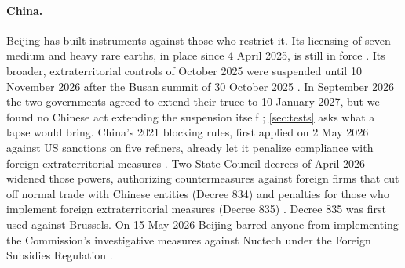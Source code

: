 \paragraph{China.} Beijing has built instruments against those who restrict it. Its licensing of seven medium and heavy rare earths, in place since 4 April 2025, is still in force \citep{mofcom2025rareearth, benchmark2026rareearth}. Its broader, extraterritorial controls of October 2025 \citep{mayerbrown2025rareearth} were suspended until 10 November 2026 after the Busan summit of 30 October 2025 \citep{whitehouse2025busan, mofcom2025pause}. In September 2026 the two governments agreed to extend their truce to 10 January 2027, but we found no Chinese act extending the suspension itself \citep{mofcom2026extension}; \cref{sec:tests} asks what a lapse would bring. China's 2021 blocking rules, first applied on 2 May 2026 against US sanctions on five refiners, already let it penalize compliance with foreign extraterritorial measures \citep{squire2026blocking, geopolitechs2026blocking}. Two State Council decrees of April 2026 widened those powers, authorizing countermeasures against foreign firms that cut off normal trade with Chinese entities (Decree 834) and penalties for those who implement foreign extraterritorial measures (Decree 835) \citep{statecouncil2026supplychain, reedsmith2026decree}. Decree 835 was first used against Brussels. On 15 May 2026 Beijing barred anyone from implementing the Commission's investigative measures against Nuctech under the Foreign Subsidies Regulation \citep{cleary2026nuctech, mofcom2026nuctech}.
